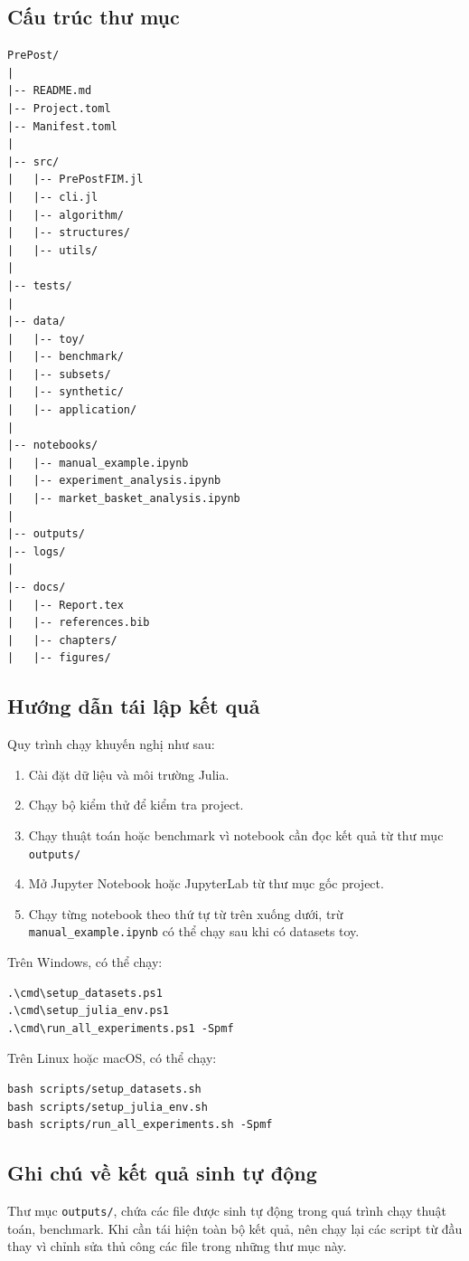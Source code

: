 \subsection{Cấu trúc thư mục}

\begin{verbatim}
PrePost/
|
|-- README.md
|-- Project.toml
|-- Manifest.toml
|
|-- src/
|   |-- PrePostFIM.jl
|   |-- cli.jl
|   |-- algorithm/
|   |-- structures/
|   |-- utils/
|
|-- tests/
|
|-- data/
|   |-- toy/
|   |-- benchmark/
|   |-- subsets/
|   |-- synthetic/
|   |-- application/
|
|-- notebooks/
|   |-- manual_example.ipynb
|   |-- experiment_analysis.ipynb
|   |-- market_basket_analysis.ipynb
|
|-- outputs/
|-- logs/
|
|-- docs/
|   |-- Report.tex
|   |-- references.bib
|   |-- chapters/
|   |-- figures/
\end{verbatim}

\subsection{Hướng dẫn tái lập kết quả}

Quy trình chạy khuyến nghị như sau:

\begin{enumerate}
    \item Cài đặt dữ liệu và môi trường Julia.
    \item Chạy bộ kiểm thử để kiểm tra project.
    \item Chạy thuật toán hoặc benchmark vì notebook cần đọc kết quả từ thư mục \texttt{outputs/}
    \item Mở Jupyter Notebook hoặc JupyterLab từ thư mục gốc project.
    \item Chạy từng notebook theo thứ tự từ trên xuống dưới, trừ \texttt{manual\_example.ipynb} có thể chạy sau khi có datasets toy.
\end{enumerate}

Trên Windows, có thể chạy:

\begin{verbatim}
.\cmd\setup_datasets.ps1
.\cmd\setup_julia_env.ps1
.\cmd\run_all_experiments.ps1 -Spmf
\end{verbatim}

Trên Linux hoặc macOS, có thể chạy:

\begin{verbatim}
bash scripts/setup_datasets.sh
bash scripts/setup_julia_env.sh
bash scripts/run_all_experiments.sh -Spmf
\end{verbatim}

\subsection{Ghi chú về kết quả sinh tự động}

Thư mục \texttt{outputs/}, chứa các file được sinh tự động trong quá trình chạy thuật toán, benchmark. Khi cần tái hiện toàn bộ kết quả, nên chạy lại các script từ đầu thay vì chỉnh sửa thủ công các file trong những thư mục này.
